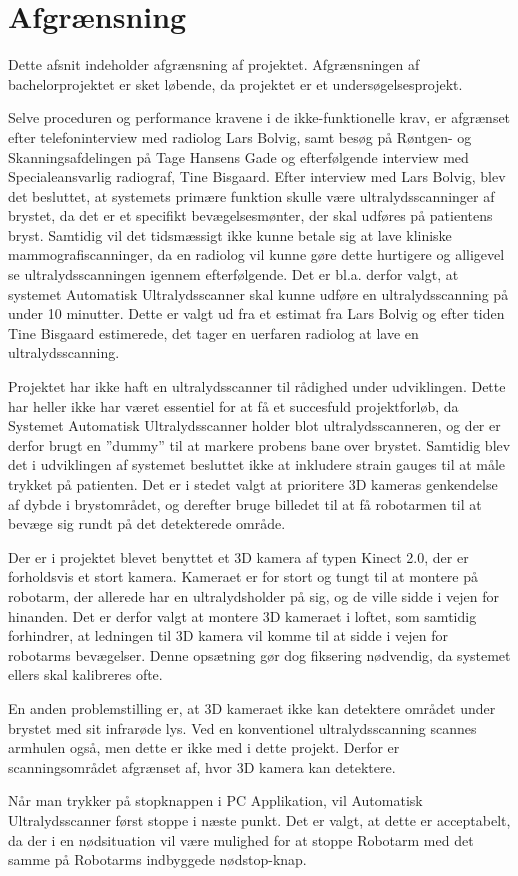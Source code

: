 \chapter{Afgrænsning}
\label{Afgransning}
Dette afsnit indeholder afgrænsning af projektet. Afgrænsningen af bachelorprojektet er sket løbende, da projektet er et undersøgelsesprojekt.

Selve proceduren og performance kravene i de ikke-funktionelle krav, er afgrænset efter telefoninterview med radiolog Lars Bolvig, samt besøg på Røntgen- og Skanningsafdelingen på Tage Hansens Gade og efterfølgende interview med Specialeansvarlig radiograf, Tine Bisgaard. Efter interview med Lars Bolvig, blev det besluttet, at systemets primære funktion skulle være ultralydsscanninger af brystet, da det er et specifikt bevægelsesmønter, der skal udføres på patientens bryst. Samtidig vil det tidsmæssigt ikke kunne betale sig at lave kliniske mammografiscanninger, da en radiolog vil kunne gøre dette hurtigere og alligevel se ultralydsscanningen igennem efterfølgende. Det er bl.a. derfor valgt, at systemet Automatisk Ultralydsscanner skal kunne udføre en ultralydsscanning på under 10 minutter. Dette er valgt ud fra et estimat fra Lars Bolvig og efter tiden Tine Bisgaard estimerede, det tager en uerfaren radiolog at lave en ultralydsscanning. 

Projektet har ikke haft en ultralydsscanner til rådighed under udviklingen. Dette har heller ikke har været essentiel for at få et succesfuld projektforløb, da Systemet Automatisk Ultralydsscanner holder blot ultralydsscanneren, og der er derfor brugt en ”dummy” til at markere probens bane over brystet. Samtidig blev det i udviklingen af systemet besluttet ikke at inkludere strain gauges til at måle trykket på patienten. Det er i stedet valgt at prioritere 3D kameras genkendelse af dybde i brystområdet, og derefter bruge billedet til at få robotarmen til at bevæge sig rundt på det detekterede område. 

Der er i projektet blevet benyttet et 3D kamera af typen Kinect 2.0, der er forholdsvis et stort kamera. Kameraet er for stort og tungt til at montere på robotarm, der allerede har en ultralydsholder på sig, og de ville sidde i vejen for hinanden. Det er derfor valgt at montere 3D kameraet i loftet, som samtidig forhindrer, at ledningen til 3D kamera vil komme til at sidde i vejen for robotarms bevægelser. Denne opsætning gør dog fiksering nødvendig, da systemet ellers skal kalibreres ofte.

En anden problemstilling er, at 3D kameraet ikke kan detektere området under brystet med sit infrarøde lys. Ved en konventionel ultralydsscanning scannes armhulen også, men dette er ikke med i dette projekt. Derfor er scanningsområdet afgrænset af, hvor 3D kamera kan detektere.

Når man trykker på stopknappen i PC Applikation, vil Automatisk Ultralydsscanner først stoppe i næste punkt. Det er valgt, at dette er acceptabelt, da der i en nødsituation vil være mulighed for at stoppe Robotarm med det samme på Robotarms indbyggede nødstop-knap. 

